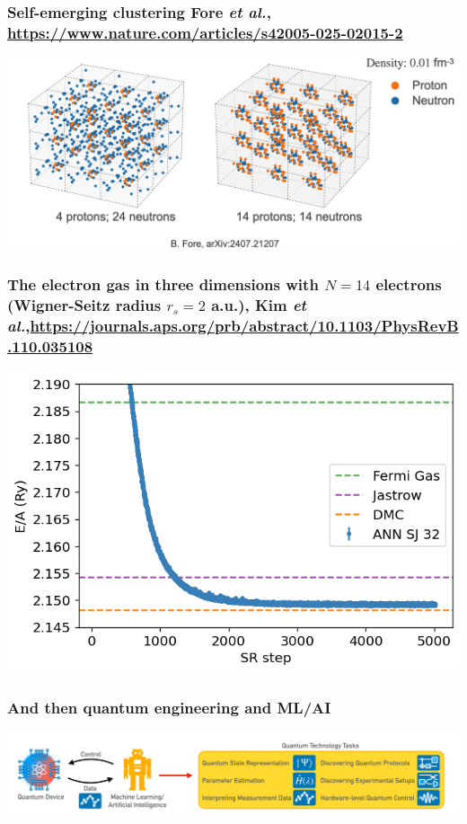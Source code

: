 \documentclass{beamer}
\begin{document}
\begin{frame}
\frametitle{Self-emerging clustering Fore {\em et al.}, \url{https://www.nature.com/articles/s42005-025-02015-2}}
\centerline{\includegraphics[width=1.0\linewidth]{figures/mbpfig7.png}}
\end{frame}


\begin{frame}
\frametitle{The electron gas in three dimensions with $N=14$ electrons (Wigner-Seitz radius $r_s=2$ a.u.), Kim {\em et al.},\url{https://journals.aps.org/prb/abstract/10.1103/PhysRevB.110.035108}}

\begin{block}{}
\centerline{\includegraphics[width=0.8\linewidth]{figures/elgasnew.png}}

\end{block}
\end{frame}



\begin{frame}
\frametitle{And then quantum engineering and ML/AI}
\centerline{\includegraphics[width=1.05\linewidth]{figures/krenn1}}

\end{frame}
\end{document}
